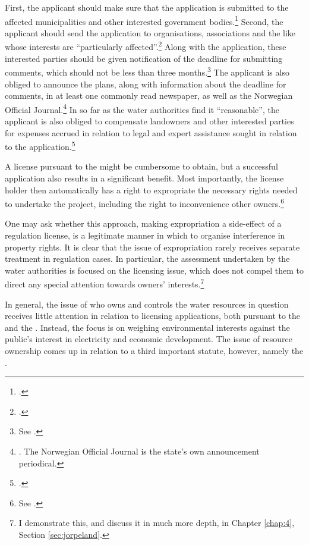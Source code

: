 First, the applicant should make sure that the application is submitted to the affected municipalities and other interested government bodies.\footcite[6]{wra17} Second, the applicant should send the application to organisations, associations and the like whose interests are ``particularly affected''.\footcite[6]{wra17} Along with the application, these interested parties should be given notification of the deadline for submitting comments, which should not be less than three months.\footnote{See \cite[6]{wra17}.} The applicant is also obliged to announce the plans, along with information about the deadline for comments, in at least one commonly read newspaper, as well as the Norwegian Official Journal.\footnote{\cite[6]{wra17}. The Norwegian Official Journal is the state's own announcement periodical.} In so far as the water authorities find it ``reasonable'', the applicant is also obliged to compensate landowners and other interested parties for expenses accrued in relation to legal and expert assistance sought in relation to the application.\footcite[6]{wra17}

A license pursuant to the \cite{wra17} might be cumbersome to obtain, but a successful application also results in a significant benefit. Most importantly, the license holder then automatically has a right to expropriate the necessary rights needed to undertake the project, including the right to inconvenience other owners.\footnote{See \cite[16]{wra17}.} 

One may ask whether this approach, making expropriation a side-effect of a regulation license, is a legitimate manner in which to organise interference in property rights. It is clear that the issue of expropriation rarely receives separate treatment in regulation cases. In particular, the assessment undertaken by the water authorities is focused on the licensing issue, which does not compel them to direct any special attention towards owners' interests.\footnote{I demonstrate this, and discuss it in much more depth, in Chapter \ref{chap:4}, Section \ref{sec:jorpeland}.}

In general, the issue of who owns and controls the water resources in question receives little attention in relation to licensing applications, both pursuant to the \cite{wra17} and the \cite{wra00}. Instead, the focus is on weighing environmental interests against the public's interest in electricity and economic development. The issue of resource ownership comes up in relation to a third important statute, however, namely the  \cite{ica17}.

